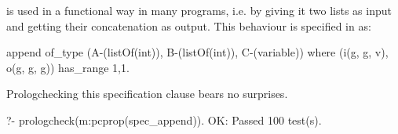  is used in a functional way in many programs,
i.e. by giving it two lists as input and getting their concatenation as
output.
%
This behaviour is specified in \plqc{} as:
\begin{yapcode}
 append of_type (A-(listOf(int)), B-(listOf(int)), C-(variable))
   where (i(g, g, v), o(g, g, g))  has_range {1,1}.
\end{yapcode}
%
Prologchecking this specification clause bears no surprises.
%
\begin{yapcode}
   ?- prologcheck(m:pcprop(spec_append)).
 OK: Passed 100 test(s).
\end{yapcode}


